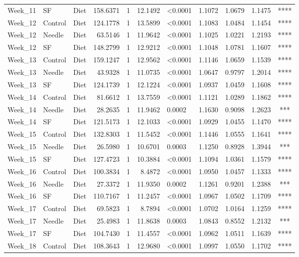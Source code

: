 \documentclass[
  12pt,
  letterpaper,
]{article}
\begin{document}
\begin{longtable}{lllrrrlrrrc}
Week\_11 & SF & Diet & 158.6371 & 1 & 12.1492 & <0.0001 & 1.1072 & 1.0679 & 1.1475 & **** \\ 
Week\_12 & Control & Diet & 124.1778 & 1 & 13.5899 & <0.0001 & 1.1083 & 1.0484 & 1.1454 & **** \\ 
Week\_12 & Needle & Diet & 63.5146 & 1 & 11.9642 & <0.0001 & 1.1025 & 1.0221 & 1.2193 & **** \\ 
Week\_12 & SF & Diet & 148.2799 & 1 & 12.9212 & <0.0001 & 1.1048 & 1.0781 & 1.1607 & **** \\ 
Week\_13 & Control & Diet & 159.1247 & 1 & 12.9562 & <0.0001 & 1.1146 & 1.0659 & 1.1539 & **** \\ 
Week\_13 & Needle & Diet & 43.9328 & 1 & 11.0735 & <0.0001 & 1.0647 & 0.9797 & 1.2014 & **** \\ 
Week\_13 & SF & Diet & 124.1739 & 1 & 12.1224 & <0.0001 & 1.0937 & 1.0459 & 1.1608 & **** \\ 
Week\_14 & Control & Diet & 81.6612 & 1 & 13.7559 & <0.0001 & 1.1121 & 1.0289 & 1.1862 & **** \\ 
Week\_14 & Needle & Diet & 28.2635 & 1 & 11.9462 & 0.0002 & 1.1630 & 0.9098 & 1.2623 & *** \\ 
Week\_14 & SF & Diet & 121.5173 & 1 & 12.1033 & <0.0001 & 1.0929 & 1.0455 & 1.1470 & **** \\ 
Week\_15 & Control & Diet & 132.8303 & 1 & 11.5452 & <0.0001 & 1.1446 & 1.0555 & 1.1641 & **** \\ 
Week\_15 & Needle & Diet & 26.5980 & 1 & 10.6701 & 0.0003 & 1.1250 & 0.8928 & 1.3944 & *** \\ 
Week\_15 & SF & Diet & 127.4723 & 1 & 10.3884 & <0.0001 & 1.1094 & 1.0361 & 1.1579 & **** \\ 
Week\_16 & Control & Diet & 100.3834 & 1 & 8.4872 & <0.0001 & 1.0950 & 1.0457 & 1.1333 & **** \\ 
Week\_16 & Needle & Diet & 27.3372 & 1 & 11.9350 & 0.0002 & 1.1261 & 0.9201 & 1.2388 & *** \\ 
Week\_16 & SF & Diet & 110.7167 & 1 & 11.2457 & <0.0001 & 1.0967 & 1.0502 & 1.1709 & **** \\ 
Week\_17 & Control & Diet & 69.5823 & 1 & 8.7894 & <0.0001 & 1.0702 & 1.0164 & 1.1259 & **** \\ 
Week\_17 & Needle & Diet & 25.4983 & 1 & 11.8638 & 0.0003 & 1.0843 & 0.8552 & 1.2132 & *** \\ 
Week\_17 & SF & Diet & 104.7430 & 1 & 11.4557 & <0.0001 & 1.0962 & 1.0511 & 1.1639 & **** \\ 
Week\_18 & Control & Diet & 108.3643 & 1 & 12.9680 & <0.0001 & 1.0997 & 1.0550 & 1.1702 & **** \\ 

\end{longtable}
\end{document}
